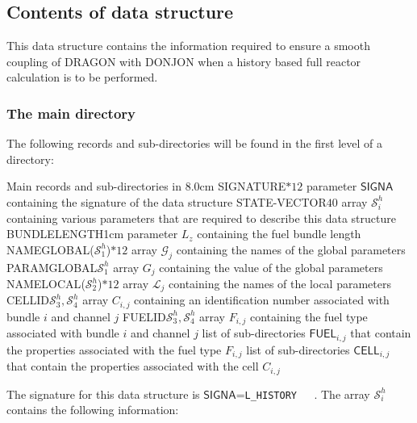 \subsection{Contents of  data structure}\label{sect:hstdir}

This data structure contains the information required to ensure a smooth coupling of DRAGON with DONJON when a history
based full reactor calculation is to be performed.

\subsubsection{The main directory}\label{sect:historydirmain}

The following records and sub-directories will be found in the first level of a  directory:

\begin{DescriptionEnregistrement}{Main records and sub-directories in }{8.0cm}
\CharEnr
  {SIGNATURE}{$*12$}
   {parameter $\mathsf{SIGNA}$ containing the signature of the data structure}
\IntEnr
  {STATE-VECTOR}{$40$}
  {array $\mathcal{S}^{h}_{i}$ containing various parameters that are required to describe this data structure}
\RealEnr
  {BUNDLELENGTH}{1}{cm}
  {parameter $L_{z}$ containing the fuel bundle length}
\CharEnr
  {NAMEGLOBAL}{($\mathcal{S}^{h}_{1}$)$*12$}
  {array $\mathcal{G}_{j}$ containing the names of the global parameters}
\RealEnr
  {PARAMGLOBAL}{$\mathcal{S}^{h}_{1}$}{}
  {array $G_{j}$ containing the value of the global parameters}
\CharEnr
  {NAMELOCAL}{($\mathcal{S}^{h}_{2}$)$*12$}
  {array $\mathcal{L}_{j}$ containing the names of the local parameters}
\IntEnr
  {CELLID}{$\mathcal{S}^{h}_{3},\mathcal{S}^{h}_{4}$}
  {array $C_{i,j}$ containing an identification number associated with bundle $i$ and channel $j$}
\IntEnr
  {FUELID}{$\mathcal{S}^{h}_{3},\mathcal{S}^{h}_{4}$}
  {array $F_{i,j}$ containing the fuel type associated with bundle $i$ and channel $j$}
\DirVar
  {}
  {list of sub-directories $\mathsf{FUEL}_{i,j}$ that contain the properties associated with the fuel type $F_{i,j}$} 
\DirVar
  {}
  {list of sub-directories $\mathsf{CELL}_{i,j}$ that contain the properties associated with the cell $C_{i,j}$} 
\end{DescriptionEnregistrement}

The signature for this data structure is $\mathsf{SIGNA}$=\verb*|L_HISTORY   |.  The array $\mathcal{S}^{h}_{i}$
contains the following information: 


